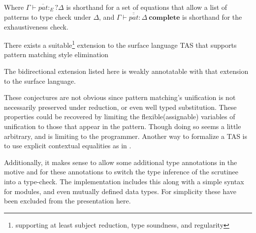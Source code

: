 Where $\Gamma\vdash\overline{pat}:_{E}?\Delta$ is shorthand for a set of equations that allow a list of patterns to type check under $\Delta$, 
  and $\Gamma\vdash\overline{\overline{pat}}:\Delta\ \mathbf{complete}$ is shorthand for the exhaustiveness check. 
\begin{conjecture}
There exists a suitable\footnote{supporting at least subject reduction, type soundness, and regularity} extension to the surface language \ac{TAS} that supports pattern matching style elimination
\end{conjecture}
\begin{conjecture}
The bidirectional extension listed here is weakly annotatable with that extension to the surface language.
\end{conjecture}
 
These conjectures are not obvious since pattern matching's unification is not necessarily preserved under reduction, or even well typed substitution.
These properties could be recovered by limiting the flexible(assignable) variables of unification to those that appear in the pattern.
Though doing so seems a little arbitrary, and is limiting to the programmer.
Another way to formalize a \ac{TAS} is to use explicit contextual equalities as in \cite{sjoberg2012irrelevance}.

Additionally, it makes sense to allow some additional type annotations in the motive and for these annotations to switch the type inference of the scrutinee into a type-check.
The implementation includes this along with a simple syntax for modules, and even mutually defined data types.
For simplicity these have been excluded from the presentation here.